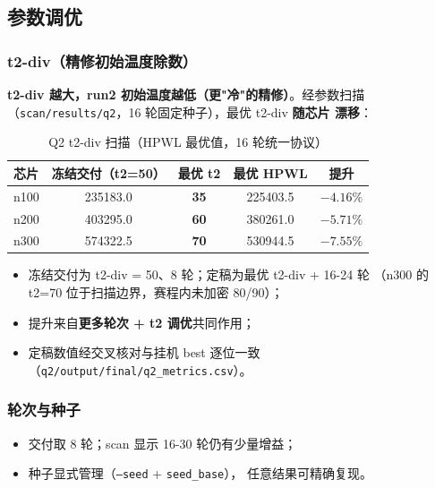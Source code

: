 \documentclass[12pt,a4paper]{article}
\begin{document}
\subsection{参数调优}

\subsubsection{t2-div（精修初始温度除数）}

\textbf{t2-div 越大，run2 初始温度越低（更"冷"的精修）}。经参数扫描
（\texttt{scan/results/q2}，16 轮固定种子），最优 t2-div \textbf{随芯片
漂移}：

\begin{table}[H]
\centering
\small
\caption{Q2 t2-div 扫描（HPWL 最优值，16 轮统一协议）}
\begin{tabular}{lcccc}
\toprule
芯片 & 冻结交付（t2=50） & 最优 t2 & 最优 HPWL & 提升 \\
\midrule
n100 & 235183.0 & \textbf{35} & 225403.5 & $-4.16\%$ \\
n200 & 403295.0 & \textbf{60} & 380261.0 & $-5.71\%$ \\
n300 & 574322.5 & \textbf{70} & 530944.5 & $-7.55\%$ \\
\bottomrule
\end{tabular}
\end{table}

\begin{itemize}
    \item 冻结交付为 t2-div = 50、8 轮；定稿为最优 t2-div + 16-24 轮
    （n300 的 t2=70 位于扫描边界，赛程内未加密 80/90）；
    \item 提升来自\textbf{更多轮次 + t2 调优}共同作用；
    \item 定稿数值经交叉核对与挂机 best 逐位一致
    （\texttt{q2/output/final/q2\_metrics.csv}）。
\end{itemize}

\subsubsection{轮次与种子}

\begin{itemize}
    \item 交付取 8 轮；scan 显示 16-30 轮仍有少量增益；
    \item 种子显式管理（\texttt{--seed} + \texttt{seed\_base}），
    任意结果可精确复现。
\end{itemize}
\end{document}
